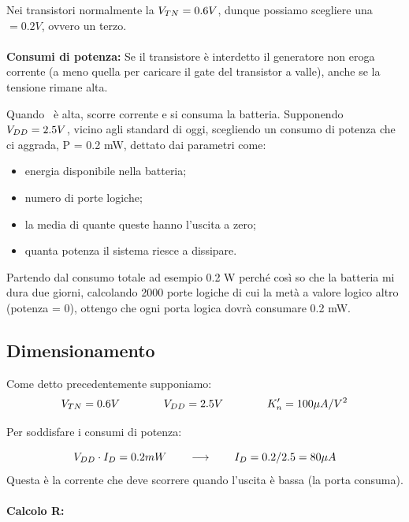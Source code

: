 Nei transistori normalmente la $V_{TN} = 0.6V$, dunque possiamo scegliere una \vl $= 0.2V$, ovvero un terzo.
\paragraph{}
\textbf{Consumi di potenza:} Se il transistore è interdetto il generatore non eroga corrente (a meno quella per caricare il gate del transistor a valle), anche se la tensione rimane alta.

Quando \vi $\,$ è alta, scorre corrente e si consuma la batteria. Supponendo $V_{DD} = 2.5V$, vicino agli standard di oggi, scegliendo un consumo di potenza che ci aggrada, P = 0.2 mW, dettato dai parametri come: 

\begin{itemize}
    \item energia disponibile nella batteria;
    \item numero di porte logiche;
    \item la media di quante queste hanno l'uscita a zero;
    \item quanta potenza il sistema riesce a dissipare.
\end{itemize}

Partendo dal consumo totale ad esempio 0.2 W perché così so che la batteria mi dura due giorni, calcolando 2000 porte logiche di cui la metà a valore logico altro (potenza = 0), ottengo che ogni porta logica dovrà consumare 0.2 mW.


\subsection{Dimensionamento}
Come detto precedentemente supponiamo:
\begin{equation*}
    V_{TN} = 0.6V \qquad\qquad V_{DD} = 2.5V \qquad\qquad K_n' = 100\mu A/V^2
\end{equation*}

Per soddisfare i consumi di potenza:

\begin{equation*}
    V_{DD} \cdot I_D = 0.2 mW \qquad \longrightarrow \qquad I_D = 0.2 / 2.5 = 80 \mu A
\end{equation*}
Questa è la corrente che deve scorrere quando l'uscita è bassa (la porta consuma).

\paragraph{Calcolo R:}

